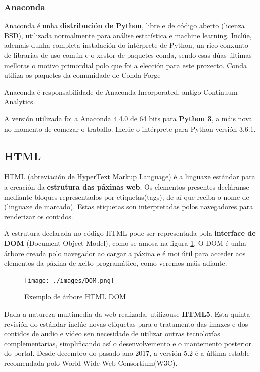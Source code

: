 \subsubsection{Anaconda}

Anaconda é unha \textbf{distribución de Python}, libre e de código aberto (licenza BSD), utilizada normalmente para análise estatística e machine learning. Inclúe, ademais dunha completa instalación do intérprete de Python, un rico conxunto de librarías de uso común e o xestor de paquetes conda, sendo esas dúas últimas melloras o motivo primordial polo que foi a elección para este proxecto. Conda utiliza os paquetes da comunidade de Conda Forge \cite{anaconda1}

Anaconda é responsabilidade de Anaconda Incorporated, antigo Continuum Analytics.

A versión utilizada foi a Anaconda 4.4.0 de 64 bits para \textbf{Python 3}, a máis nova no momento de comezar o traballo. Inclúe o intérprete para Python versión 3.6.1.


\subsection{HTML}

HTML (abreviación de HyperText Markup Language) é a linguaxe estándar para a creación da \textbf{estrutura das páxinas web}. Os 
elementos presentes decláranse mediante bloques representados por etiquetas(tags), de aí que reciba o nome de
 (linguaxe de marcado). Estas etiquetas son interpretadas polos navegadores para renderizar os 
contidos\cite{html1}. 

A estrutura declarada no código HTML pode ser representada pola \textbf{interface de DOM} (Document Object Model), como se amosa na figura \ref{fig:img_DOM}. O DOM é unha árbore creada polo navegador ao cargar a páxina e é moi útil para acceder aos elementos da páxina de xeito programático, como veremos máis adiante.

\begin{figure}[h]
	\centering
	\texttt{[image: ./images/DOM.png]}
	\caption{Exemplo de árbore HTML DOM\protect\cite{dom}}
	\label{fig:img_DOM}
\end{figure}

Dada a natureza multimedia da web realizada, utilizouse \textbf{HTML5}. Esta quinta revisión do estándar inclúe novas etiquetas 
para o tratamento das imaxes e dos contidos de audio e vídeo sen necesidade de utilizar outras tecnoloxías complementarias, 
simplificando así o desenvolvemento e o mantemento posterior do portal. Desde decembro do pasado ano 2017, a versión 5.2 é a última estable recomendada polo World Wide Web Consortium(W3C)\cite{html_w3c}.


